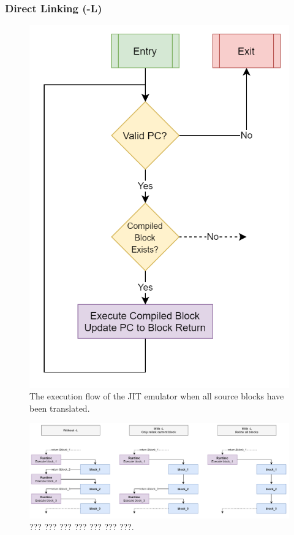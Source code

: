 \subsubsection{Direct Linking (-L)}


\begin{figure}[h]
    \centering
    \includegraphics[width=0.5\linewidth]{diagrams/jit-steady.png}
    \caption{The execution flow of the JIT emulator when all source blocks have been translated.}
    \label{figure:jit-steady}
\end{figure}


\begin{figure}[h]
    \centering
    \includegraphics[width=1\linewidth]{diagrams/relinking.png}
    \caption{??? ??? ??? ??? ??? ??? ???.}
    \label{figure:relinking}
\end{figure}